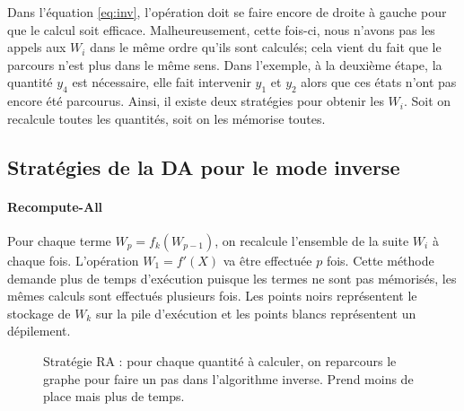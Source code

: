 \noindent
Dans l'\'equation \ref{eq:inv}, l'op\'eration doit se faire encore de droite \`a gauche pour que le calcul soit efficace. Malheureusement, cette fois-ci,
nous n'avons pas les appels aux $W_i$ dans le même ordre qu'ils sont calcul\'es; cela vient du fait que le parcours
n'est plus dans le même sens. Dans l'exemple, \`a la deuxi\`eme \'etape, la 
quantit\'e $y_4$ est n\'ecessaire, elle fait intervenir $y_1$ et $y_2$ alors que ces \'etats n'ont pas encore \'et\'e parcourus.
Ainsi, il existe deux strat\'egies pour obtenir les $W_i$. Soit on recalcule toutes les quantit\'es, soit on les m\'emorise toutes.




    \subsection{Strat\'egies de la DA pour le mode inverse}
% 
% 
\label{subsection:strategies}
 \paragraph{Recompute-All}
Pour chaque terme $W_p=f_k(W_{p-1})$, on recalcule l'ensemble de la suite $W_i$ \`a chaque fois. L'op\'eration $W_1 =f'(X)$ va être effectu\'ee $p$ fois.
 Cette m\'ethode demande plus de temps d'ex\'ecution puisque les termes ne sont pas m\'emoris\'es, les mêmes 
calculs sont effectu\'es plusieurs fois. Les points noirs repr\'esentent le stockage de $W_k$ sur la pile
d'ex\'ecution et les points blancs repr\'esentent un d\'epilement.


\begin{figure}
\caption{Strat\'egie RA : pour chaque quantit\'e \`a calculer, on reparcours le graphe pour faire un pas dans l'algorithme inverse. Prend moins de place mais
plus de temps.}
\label{fig:ra}
\end{figure}


